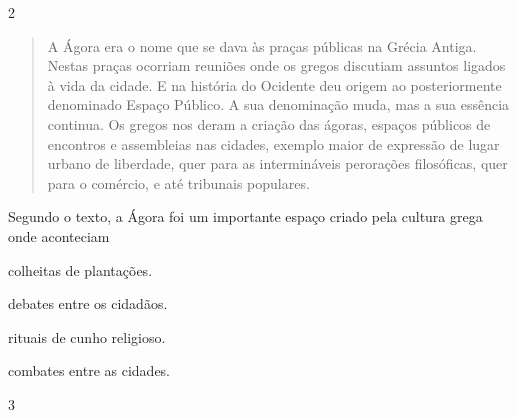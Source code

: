 \num{2}

\begin{quote}
A Ágora era o nome que se dava às praças públicas na Grécia Antiga.
Nestas praças ocorriam reuniões onde os gregos discutiam assuntos
ligados à vida da cidade. E na história do Ocidente deu origem ao
posteriormente denominado Espaço Público. A sua denominação muda, mas a
sua essência continua. Os gregos nos deram a criação das ágoras, espaços
públicos de encontros e assembleias nas cidades, exemplo maior de
expressão de lugar urbano de liberdade, quer para as intermináveis
perorações filosóficas, quer para o comércio, e até tribunais populares.
\end{quote}

Segundo o texto, a Ágora foi um importante espaço criado pela cultura
grega onde aconteciam

\begin{escolha}
\item colheitas de plantações.

\item debates entre os cidadãos.

\item rituais de cunho religioso.

\item combates entre as cidades.
\end{escolha}


\num{3}


